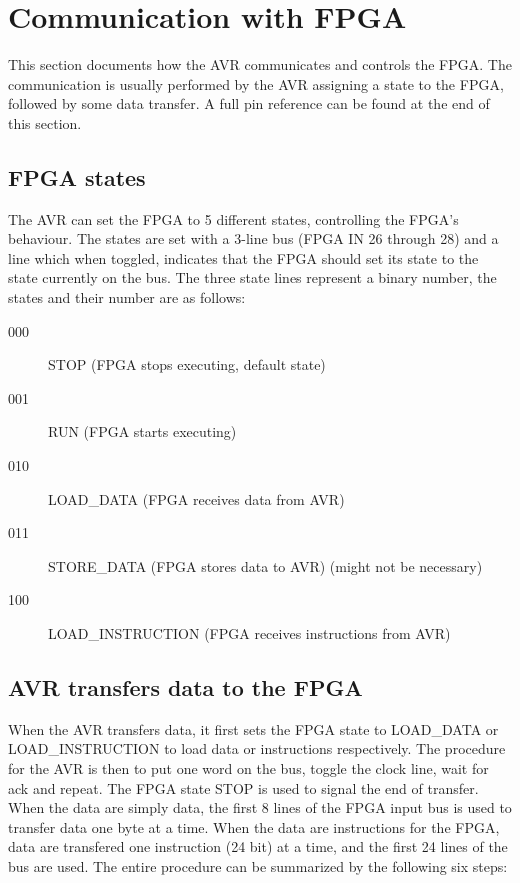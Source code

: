 \section{Communication with FPGA}
\label{sec:avr-fpga-communication}

This section documents how the AVR communicates and controls the FPGA. The communication is usually performed by the AVR assigning a state to the FPGA, followed by some data transfer. A full pin reference can be found at the end of this section.

\subsection{FPGA states}

The AVR can set the FPGA to 5 different states, controlling the FPGA's behaviour. The states are set with a 3-line bus (FPGA IN 26 through 28) and a line which when toggled, indicates that the FPGA should set its state to the state currently on the bus. The three state lines represent a binary number, the states and their number are as follows:

\begin{description}
\item[000] STOP (FPGA stops executing, default state) 
\item[001] RUN (FPGA starts executing) 
\item[010] LOAD\_DATA (FPGA receives data from AVR) 
\item[011] STORE\_DATA (FPGA stores data to AVR) (might not be necessary) 
\item[100] LOAD\_INSTRUCTION (FPGA receives instructions from AVR) 
\end{description}


\subsection{AVR transfers data to the FPGA}

When the AVR transfers data, it first sets the FPGA state to LOAD\_DATA or LOAD\_INSTRUCTION to load data or instructions respectively. The procedure for the AVR is then to put one word on the bus, toggle the clock line, wait for ack and repeat. The FPGA state STOP is used to signal the end of transfer. When the data are simply data, the first 8 lines of the FPGA input bus is used to transfer data one byte at a time. When the data are instructions for the FPGA, data are transfered one instruction (24 bit) at a time, and the first 24 lines of the bus are used. The entire procedure can be summarized by the following six steps:


